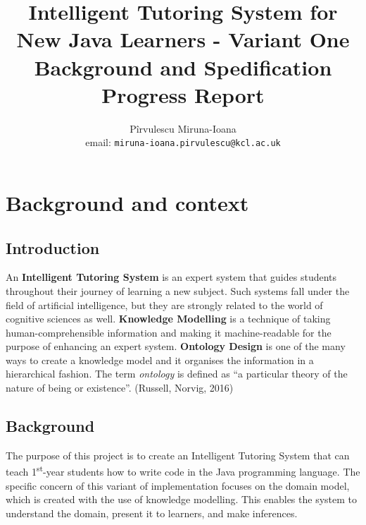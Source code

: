 \documentclass[titlepage]{article}
\title{Intelligent Tutoring System for New Java Learners - Variant One\\Background and Spedification Progress Report}
\author {Pîrvulescu Miruna-Ioana\\email: \texttt{miruna-ioana.pirvulescu@kcl.ac.uk}}
\begin{document}
\maketitle
\tableofcontents
\newpage
\section{Background and context}
\subsection{Introduction}
An \textbf{Intelligent Tutoring System} is an expert system that guides students throughout their journey of learning a new subject. Such systems fall under the field of artificial intelligence, but they are strongly related to the world of cognitive sciences as well.
\newline
\textbf{Knowledge Modelling} is a technique of taking human-comprehensible information and making it machine-readable for the purpose of enhancing an expert system.
\newline
\textbf{Ontology Design} is one of the many ways to create a knowledge model and it organises the information in a hierarchical fashion. The term \textit{ontology} is defined as ``a particular theory of the nature of being or existence''. (Russell, Norvig, 2016)\cite{aimaontology}
\subsection{Background}
The purpose of this project is to create an Intelligent Tutoring System that can teach 1\textsuperscript{st}-year students how to write code in the Java programming language. The specific concern of this variant of implementation focuses on the domain model, which is created with the use of knowledge modelling. This enables the system to understand the domain, present it to learners, and make inferences.
\end{document}
